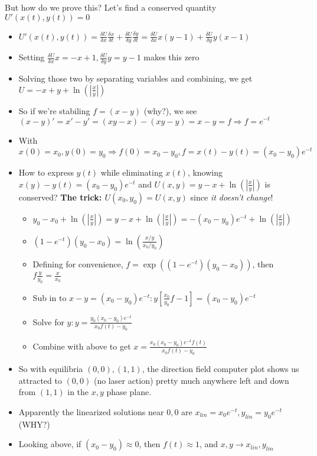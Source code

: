 \documentclass[11pt, oneside]{article}   	%
\begin{document}
But how do we prove this?  Let's find a conserved quantity $U'(x(t), y(t)) =  0$
\begin{itemize}
\item $U'(x(t), y(t)) =  \frac{\delta U}{\delta x}\frac{\delta x}{\delta t}  + \frac{\delta U}{\delta y}\frac{\delta y}{\delta t} = \frac{\delta U}{\delta x}x(y-1) + \frac{\delta U}{\delta y}y(x-1)$
\item Setting $\frac{\delta U}{\delta x}x = -x+1, \frac{\delta U}{\delta y}y = y-1$ makes this zero
\item Solving those two by separating variables and combining, we get $U = -x+y+\ln(|\frac{x}{y}|)$
\item So if we're stabiling $f = (x-y)$ (why?), we see $(x-y)' = x'-y' = (xy-x) - (xy-y) = x-y = f \Rightarrow f = e^{-t}$
\item With $x(0) = x_0, y(0) = y_0 \Rightarrow f(0) = x_0 - y_0, f = x(t) - y(t) =  (x_0 - y_0)e^{-t}$
\item How to express $y(t)$ while eliminating $x(t)$, knowing $x(y) - y(t) = (x_0 - y_0)e^{-t}$ and $U(x,y) = y-x + \ln(|\frac{x}{y}|)$ is conserved?  \textbf{The trick: $U(x_0, y_0) = U(x,y)$} since \emph{it doesn't change}!
\begin{itemize}
\item $y_0 - x_0 +  \ln(|\frac{x}{y}|) =  y - x + \ln(|\frac{x}{y}|) = -(x_0-y_0)e^{-t} + \ln(|\frac{x}{y}|) $
\item $(1-e^{-t})(y_0 - x_0)   = \ln(\frac{x / y}{x_0 / y_0}) $
\item Defining for convenience, $f = \exp((1-e^{-t})(y_0 - x_0) )$, then $f\frac{y}{y_0} = \frac{x}{x_0}$
\item Sub in to $x - y = (x_0 - y_0)e^{-t}: y[\frac{x_0}{y_0}f - 1] = (x_0 - y_0)e^{-t}$
\item Solve for $y: y = \frac{y_0(x_0-y_0)e^{-t}}{x_0f(t) - y_0}$ 
\item Combine with above to get $x = \frac{x_0(x_0-y_0)e^{-t}f(t)}{x_0f(t) - y_0}$
\end{itemize}
\item So with equilibria $(0,0), (1,1)$, the direction field computer plot shows us attracted to $(0,0)$ (no laser action) pretty much anywhere left and down from $(1,1)$ in the $x,y$ phase plane.
\item Apparently the linearized solutions near $0,0$ are $x_{lin} = x_0e^{-t}, y_{lin} = y_0e^{-t}$ (WHY?)
\item Looking above, if $(x_0 - y_0) \approx 0$, then $f(t) \approx 1$, and $x, y \rightarrow x_{lin}, y_{lin}$
\end{itemize}
\end{document}
